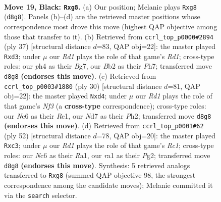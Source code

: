 \documentclass[11pt]{article}
\begin{document}
\clearpage

\begin{figure}[p]\centering
\begin{subfigure}{0.46\textwidth}\centering
\resizebox{\linewidth}{!}{%
\newchessgame
\chessboard[
  setfen={2kr2B1/1ppnp2p/2n3p1/p7/5B1P/N4P2/PbP1KP2/R5R1 b - - 0 19},
  showmover=false,
  pgfstyle=straightmove, color=movearrow, markmove={d8-g8}
]}
\caption{}
\end{subfigure}\hfill
\begin{subfigure}{0.46\textwidth}\centering
\resizebox{\linewidth}{!}{%
\newchessgame
\chessboard[
  setfen={3rk3/pp2p1bp/2n1b1p1/8/8/2PB4/PP3KPP/R1B1R3 b - - 0 19},
  showmover=false,
  pgfstyle=straightmove, color=movearrow, markmove={d8-d3}
]}
\caption{}
\end{subfigure}
\\[4pt]
\begin{subfigure}{0.46\textwidth}\centering
\resizebox{\linewidth}{!}{%
\newchessgame
\chessboard[
  setfen={r3k2r/1p2nppp/2p5/p3P1B1/2bb4/P4N2/1P3PPP/2RR2K1 w kq - 0 16},
  showmover=false,
  pgfstyle=straightmove, color=movearrow, markmove={f3-d4}
]}
\caption{}
\end{subfigure}\hfill
\begin{subfigure}{0.46\textwidth}\centering
\resizebox{\linewidth}{!}{%
\newchessgame
\chessboard[
  setfen={r3rbk1/3b1pp1/2N4p/8/p2N4/P1n1P3/5PPP/R1R3K1 w - - 0 27},
  showmover=false,
  pgfstyle=straightmove, color=movearrow, markmove={c1-c3}
]}
\caption{}
\end{subfigure}
\caption{\textbf{Move 19, Black: \texttt{Rxg8}.} (a) Our position; Melanie plays \texttt{Rxg8} (\texttt{d8g8}). Panels (b)--(d) are the retrieved master positions whose correspondence most drove this move (highest QAP objective among those that transfer to it). (b) Retrieved from \texttt{ccrl\_top\_p0000\#2894} (ply 37) [structural distance $d$=83, QAP obj=22]: the master played \texttt{Rxd3}; under $\mu$ our \emph{Rd1} plays the role of that game's \emph{Rd1}; cross-type roles: our \emph{p}h4 as their \emph{B}g7, our \emph{B}b2 as their \emph{P}h7; transferred move \texttt{d8g8} \textbf{(endorses this move)}. (c) Retrieved from \texttt{ccrl\_top\_p0003\#1880} (ply 30) [structural distance $d$=81, QAP obj=22]: the master played \texttt{Nxd4}; under $\mu$ our \emph{Rd1} plays the role of that game's \emph{Nf3} (a \textbf{cross-type} correspondence); cross-type roles: our \emph{N}c6 as their \emph{R}c1, our \emph{N}d7 as their \emph{P}h2; transferred move \texttt{d8g8} \textbf{(endorses this move)}. (d) Retrieved from \texttt{ccrl\_top\_p0001\#62} (ply 52) [structural distance $d$=78, QAP obj=20]: the master played \texttt{Rxc3}; under $\mu$ our \emph{Rd1} plays the role of that game's \emph{Rc1}; cross-type roles: our \emph{N}c6 as their \emph{R}a1, our \emph{r}a1 as their \emph{P}g2; transferred move \texttt{d8g8} \textbf{(endorses this move)}. Synthesis: 5 retrieved analogs transferred to \texttt{Rxg8} (summed QAP objective 98, the strongest correspondence among the candidate moves); Melanie committed it via the \texttt{search} selector.}
\label{fig:thought-m37}
\end{figure}
\end{document}
